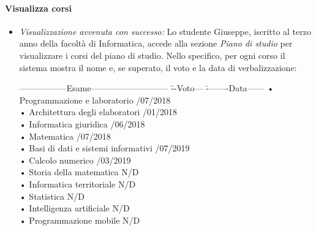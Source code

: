 \paragraph{Visualizza corsi}
\begin{itemize}
	\item \textit{Visualizzazione avvenuta con successo:}
	Lo studente Giuseppe, iscritto al terzo anno della facoltà di Informatica, accede alla sezione \textit{Piano di studio} per visualizzare i corsi del piano di studio. Nello specifico, per ogni corso il sistema mostra il nome e, se superato, il voto e la data di verbalizzazione:
	\begin{tabbing}
		\hspace{1cm}-----------------Esame--------------------------- \= --Voto--- \= --------Data------ \kill
		\hspace{1cm} • Programmazione e laboratorio  /07/2018 \\
		\hspace{1cm} • Architettura degli elaboratori  /01/2018 \\
		\hspace{1cm} • Informatica giuridica  /06/2018 \\
		\hspace{1cm} • Matematica  /07/2018 \\
		\hspace{1cm} • Basi di dati e sistemi informativi  /07/2019 \\
		\hspace{1cm} • Calcolo numerico  /03/2019 \\
		\hspace{1cm} • Storia della matematica \> N/D \>\\
		\hspace{1cm} • Informatica territoriale \> N/D \>\\
		\hspace{1cm} • Statistica \> N/D \>\\
		\hspace{1cm} • Intelligenza artificiale \> N/D \>\\
		\hspace{1cm} • Programmazione mobile \> N/D \>\\
	\end{tabbing}
\end{itemize}

